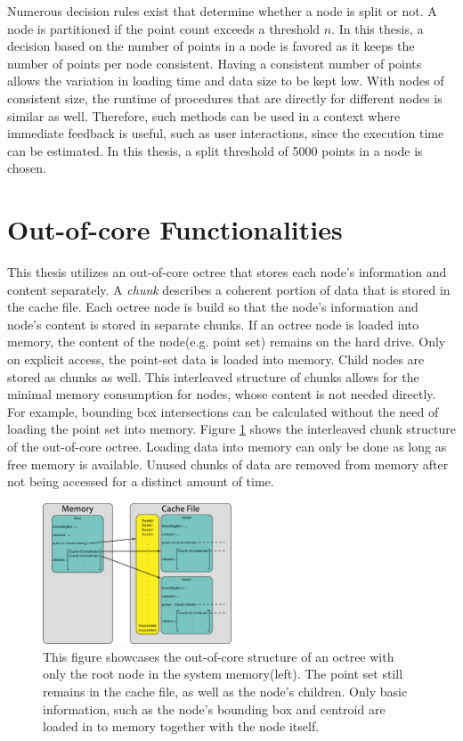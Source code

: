 \par

Numerous decision rules exist that determine whether a node is split or not. A node is partitioned if the point count exceeds a threshold $n$. In this thesis, a decision based on the number of points in a node is favored as it keeps the number of points per node consistent.
Having a consistent number of points allows the variation in loading time and data size to be kept low. With nodes of consistent size, the runtime of procedures that are directly for different nodes is similar as well. Therefore, such methods can be used in a context where immediate feedback is useful, such as user interactions, since the execution time can be estimated. In this thesis, a split threshold of 5000 points in a node is chosen. 


\section{Out-of-core Functionalities}

This thesis utilizes an out-of-core octree that stores each node's information and content separately. A \textit{chunk} describes a coherent portion of data that is stored in the cache file. Each octree node is build so that the node's information and node's content is stored in separate chunks. If an octree node is loaded into memory, the content of the node(e.g. point set) remains on the hard drive. Only on explicit access, the point-set data is loaded into memory. Child nodes are stored as chunks as well. This interleaved structure of chunks allows for the minimal memory consumption for nodes, whose content is not needed directly. For example, bounding box intersections can be calculated without the need of loading the point set into memory. Figure \ref{fig:out-of-core} shows the interleaved chunk structure of the out-of-core octree. Loading data into memory can only be done as long as free memory is available. Unused chunks of data are removed from memory after not being accessed for a distinct amount of time.

\begin{figure}
    \centering
    \includegraphics[width=0.5\textwidth]{Octree/out-of-core.png}
    \caption[Graphic describing the out-of-core structure of the octree]
		{This figure showcases the out-of-core structure of an octree with only the root node in the system memory(left). The point set still remains in the cache file, as well as the node's children. Only basic information, such as the node's bounding box and centroid are loaded in to memory together with the node itself.}
    \label{fig:out-of-core}
\end{figure}


